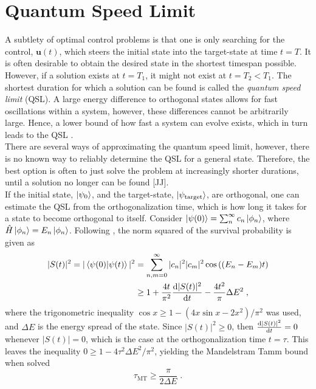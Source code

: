\section{Quantum Speed Limit}
A subtlety of optimal control problems is that one is only searching for the control, $\boldsymbol{u}(t)$, which steers the initial state into the target-state at time $t = T$. It is often desirable to obtain the desired state in the shortest timespan possible. However, if a solution exists at $t= T_1$, it might not exist at $t = T_2 < T_1$. The shortest duration for which a solution can be found is called the \textit{quantum speed limit} (QSL). A large energy difference to orthogonal states allows for fast oscillations within a system, however, these differences cannot be arbitrarily large. Hence, a lower bound of how fast a system can evolve exists, which in turn leads to the QSL \cite{Caneva2009}.\\
There are several ways of approximating the quantum speed limit, however, there is no known way to reliably determine the QSL for a general state. Therefore, the best option is often to just solve the problem at increasingly shorter durations, until a solution no longer can be found [JJ].\\
If the initial state, $\ket{\psi_0}$, and the target-state, $\ket{\psi_{\mathrm{target}}}$, are orthogonal, one can estimate the QSL from the orthogonalization time, which is how long it takes for a state to become orthogonal to itself.
Consider $\ket{\psi (0)} = \sum_{n}^{\infty} c_n \ket{\phi _n}$, where $\hat{H} \ket{\phi _n} = E_n \ket{\phi _n}$. Following \cite{QSLtoffoli}, the norm squared of the survival probability is given as
\begin{align}
	|S(t)|^2 = |\braket{\psi (0) | \psi (t)}|^2 &= \sum_{n , m = 0}^{\infty} |c_n|^2 |c_m|^2 \cos \left( (E_n - E_m) t \right) \nonumber \\
	&\geq 1 + \frac{4 t}{\pi ^2} \dv{|S(t)|^2}{t} - \frac{4 t^2}{\pi} \Delta E^2 \; ,
\end{align}
where the trigonometric inequality $\cos x \geq 1 - \left( 4 x \sin x - 2 x^2 \right) / \pi^2$ was used, and $\Delta E$ is the energy spread of the state.
Since $|S(t)|^2 \geq 0$, then $\dv{|S(t)|^2}{t} = 0$ whenever $|S(t)| = 0$, which is the case at the orthogonalization time $t = \tau$. This leaves the inequality $0 \geq 1 - 4 \tau^2 \Delta E^2 / \pi^2$, yielding the Mandelstram Tamm bound when solved \cite{Mandelstam1991}
\begin{equation}
	\tau_{\mathrm{MT}} \geq \frac{\pi}{2 \Delta E} \; .
	\label{eq:MandelstamBound}
\end{equation}
